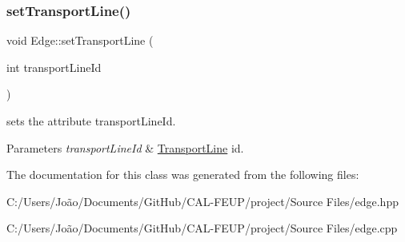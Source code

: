 \subsubsection{\texorpdfstring{set\+Transport\+Line()}{setTransportLine()}}
{\footnotesize\ttfamily void Edge\+::set\+Transport\+Line (\begin{DoxyParamCaption}\item[{int}]{transport\+Line\+Id }\end{DoxyParamCaption})}



sets the attribute transport\+Line\+Id. 


\begin{DoxyParams}{Parameters}
{\em transport\+Line\+Id} & \hyperlink{class_transport_line}{Transport\+Line} id. \\
\hline
\end{DoxyParams}


The documentation for this class was generated from the following files\+:\begin{DoxyCompactItemize}
\item 
C\+:/\+Users/\+João/\+Documents/\+Git\+Hub/\+C\+A\+L-\/\+F\+E\+U\+P/project/\+Source Files/edge.\+hpp\item 
C\+:/\+Users/\+João/\+Documents/\+Git\+Hub/\+C\+A\+L-\/\+F\+E\+U\+P/project/\+Source Files/edge.\+cpp\end{DoxyCompactItemize}
